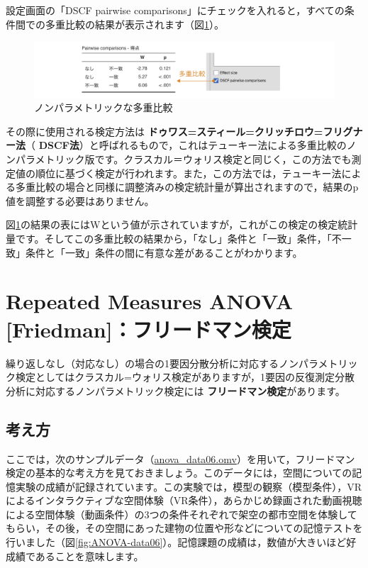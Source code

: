 \documentclass[
  12pt,
  a5jpaper,
  lualatex, ja=standard]{bxjsbook}
\renewcommand{\emph}[1]{\textbf{\color{emph} #1}}
\begin{document}
設定画面の「DSCF pairwise comparisons」にチェックを入れると，すべての条件間での多重比較の結果が表示されます（図\ref{fig:ANOVA-kw-pairwise}）。

\begin{figure}[!ht]

{\centering \includegraphics[width=1\linewidth]{images/ANOVA/kw-pairwise} 

}

\caption{ノンパラメトリックな多重比較}\label{fig:ANOVA-kw-pairwise}
\end{figure}

その際に使用される検定方法は\emph{ドゥワス=スティール=クリッチロウ=フリグナー法}（\emph{DSCF法}）と呼ばれるもので，これはテューキー法による多重比較のノンパラメトリック版です。クラスカル＝ウォリス検定と同じく，この方法でも測定値の順位に基づく検定が行われます。また，この方法では，テューキー法による多重比較の場合と同様に調整済みの検定統計量が算出されますので，結果のp値を調整する必要はありません。

図\ref{fig:ANOVA-kw-pairwise}の結果の表にはWという値が示されていますが，これがこの検定の検定統計量です。そしてこの多重比較の結果から，「なし」条件と「一致」条件，「不一致」条件と「一致」条件の間に有意な差があることがわかります。

\hypertarget{sec:ANOVA-friedman}{%
\section{Repeated Measures ANOVA {[}Friedman{]}：フリードマン検定}\label{sec:ANOVA-friedman}}

繰り返しなし（対応なし）の場合の1要因分散分析に対応するノンパラメトリック検定としてはクラスカル=ウォリス検定がありますが，1要因の反復測定分散分析に対応するノンパラメトリック検定には\emph{フリードマン検定}があります。

\hypertarget{sub:ANOVA-friedman-basics}{%
\subsection{考え方}\label{sub:ANOVA-friedman-basics}}

ここでは，次のサンプルデータ（\href{https://github.com/sbtseiji/jmv_compguide/raw/main/data/omv/anova_data06.omv}{anova\_data06.omv}）を用いて，フリードマン検定の基本的な考え方を見ておきましょう。このデータには，空間についての記憶実験の成績が記録されています。この実験では，模型の観察（模型条件），VRによるインタラクティブな空間体験（VR条件），あらかじめ録画された動画視聴による空間体験（動画条件）の3つの条件それぞれで架空の都市空間を体験してもらい，その後，その空間にあった建物の位置や形などについての記憶テストを行いました（図\ref{fig:ANOVA-data06}）。記憶課題の成績は，数値が大きいほど好成績であることを意味します。
\end{document}
